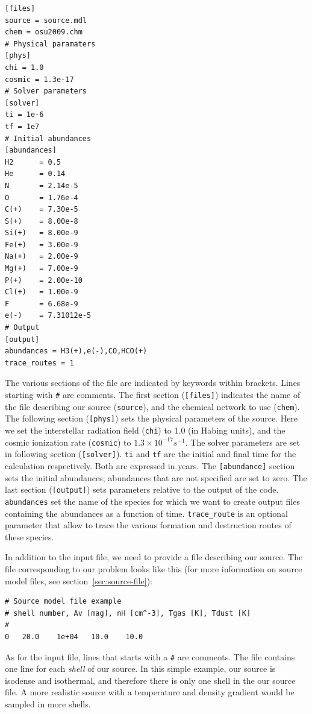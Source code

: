 \documentclass[a4paper,12pt]{article}
\begin{document}
\begin{verbatim}
[files]
source = source.mdl
chem = osu2009.chm
# Physical paramaters
[phys]
chi = 1.0
cosmic = 1.3e-17
# Solver parameters
[solver]
ti = 1e-6
tf = 1e7
# Initial abundances
[abundances]
H2      = 0.5
He      = 0.14
N       = 2.14e-5
O       = 1.76e-4
C(+)    = 7.30e-5
S(+)    = 8.00e-8
Si(+)   = 8.00e-9
Fe(+)   = 3.00e-9
Na(+)   = 2.00e-9
Mg(+)   = 7.00e-9
P(+)    = 2.00e-10
Cl(+)   = 1.00e-9
F       = 6.68e-9
e(-)    = 7.31012e-5
# Output
[output]
abundances = H3(+),e(-),CO,HCO(+)
trace_routes = 1
\end{verbatim}

The various sections of the file are indicated by keywords within
brackets. Lines starting with \verb=#= are comments. The first section
(\verb=[files]=) indicates the name of the file describing our source
(\verb=source=), and the chemical network to use (\verb=chem=). The
following section (\verb=[phys]=) sets the physical parameters of the
source. Here we set the interstellar radiation field (\verb=chi=) to
1.0 (in Habing units), and the cosmic ionization rate (\verb=cosmic=)
to $1.3 \times 10^{-17} s^{-1}$. The solver parameters are set in
following section (\verb=[solver]=). \verb=ti= and \verb=tf= are the
initial and final time for the calculation respectively. Both are
expressed in years. The \verb=[abundance]= section sets the initial
abundances; abundances that are not specified are set to zero. The
last section (\verb=[output]=) sets parameters relative to the output
of the code. \verb=abundances= set the name of the species for which
we want to create output files containing the abundances as a function
of time. \verb=trace_route= is an optional parameter that allow to
trace the various formation and destruction routes of these species.

In addition to the input file, we need to provide a file describing
our source. The file corresponding to our problem looks like this (for
more information on source model files, see
section~\ref{sec:source-file}):

\begin{verbatim}
# Source model file example
# shell number, Av [mag], nH [cm^-3], Tgas [K], Tdust [K]
#
0	20.0	1e+04	10.0	10.0
\end{verbatim}

As for the input file, lines that starts with a \verb=#= are
comments. The file contains one line for each \emph{shell} of our
source. In this simple example, our source is isodense and isothermal,
and therefore there is only one shell in the our source file. A more
realistic source with a temperature and density gradient would be
sampled in more shells.
\end{document}
